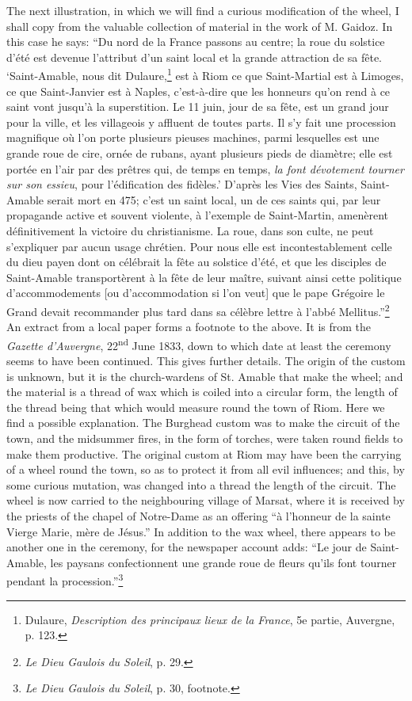 \documentclass[a4paper, 11pt, oneside, polutonikogreek, english]{article}
\begin{document}
The next illustration, in which we will find a curious modification of the wheel, I shall copy from the valuable collection of material in the work of M. Gaidoz. In this case he says: ``Du nord de la France passons au centre; la roue du solstice d'été est devenue l'attribut d'un saint local et la grande attraction de sa fête. `Saint-Amable, nous dit Dulaure,\footnote{Dulaure, \emph{Description des principaux lieux de la France}, 5e partie, Auvergne, p. 123.} est à Riom ce que Saint-Martial est à Limoges, ce que Saint-Janvier est à Naples, c'est-à-dire que les honneurs qu'on rend à ce saint vont jusqu'à la superstition. Le 11 juin, jour de sa fête, est un grand jour pour la ville, et les villageois y affluent de toutes parts. Il s'y fait une procession magnifique où l'on porte plusieurs pieuses machines, parmi lesquelles est une grande roue de cire, ornée de rubans, ayant plusieurs pieds de diamètre; elle est portée en l'air par des prêtres qui, de temps en temps, \emph{la font dévotement tourner sur son essieu}, pour l'édification des fidèles.' D'après les Vies des Saints, Saint-Amable serait mort en 475; c'est un saint local, un de ces saints qui, par leur propagande active et souvent violente, à l'exemple de Saint-Martin, amenèrent définitivement la victoire du christianisme. La roue, dans son culte, ne peut s'expliquer par aucun usage chrétien. Pour nous elle est incontestablement celle du dieu payen dont on célébrait la fête au solstice d'été, et que les disciples de Saint-Amable transportèrent à la fête de leur maître, suivant ainsi cette politique d'accommodements [ou d'accommodation si l'on veut] que le pape Grégoire le Grand devait recommander plus tard dans sa célèbre lettre à l'abbé Mellitus.''\footnote{\emph{Le Dieu Gaulois du Soleil}, p. 29.} An extract from a local paper forms a footnote to the above. It is from the \emph{Gazette d'Auvergne}, 22\textsuperscript{nd} June 1833, down to which date at least the ceremony seems to have been continued. This gives further details. The origin of the custom is unknown, but it is the church-wardens of St. Amable that make the wheel; and the material is a thread of wax which is coiled into a circular form, the length of the thread being that which would measure round the town of Riom. Here we find a possible explanation. The Burghead custom was to make the circuit of the town, and the midsummer fires, in the form of torches, were taken round fields to make them productive. The original custom at Riom may have been the carrying of a wheel round the town, so as to protect it from all evil influences; and this, by some curious mutation, was changed into a thread the length of the circuit. The wheel is now carried to the neighbouring village of Marsat, where it is received by the priests of the chapel of Notre-Dame as an offering ``à l'honneur de la sainte Vierge Marie, mère de Jésus.'' In addition to the wax wheel, there appears to be another one in the ceremony, for the newspaper account adds: ``Le jour de Saint-Amable, les paysans confectionnent une grande roue de fleurs qu'ils font tourner pendant la procession.''\footnote{\emph{Le Dieu Gaulois du Soleil}, p. 30, footnote.}
\end{document}

